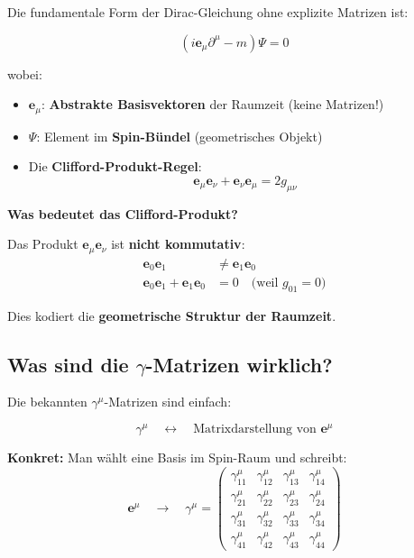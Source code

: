 Die fundamentale Form der Dirac-Gleichung ohne explizite Matrizen ist:

\begin{equation}
	\boxed{(i \mathbf{e}_\mu \partial^\mu - m)\Psi = 0}
	\label{eq:clifford_fundamental}
\end{equation}

wobei:
\begin{itemize}
	\item $\mathbf{e}_\mu$: \textbf{Abstrakte Basisvektoren} der Raumzeit (keine Matrizen!)
	\item $\Psi$: Element im \textbf{Spin-Bündel} (geometrisches Objekt)
	\item Die \textbf{Clifford-Produkt-Regel}:
	\begin{equation}
		\mathbf{e}_\mu \mathbf{e}_\nu + \mathbf{e}_\nu \mathbf{e}_\mu = 2 g_{\mu\nu}
		\label{eq:clifford_product_rule}
	\end{equation}
\end{itemize}

\textbf{Was bedeutet das Clifford-Produkt?}

Das Produkt $\mathbf{e}_\mu \mathbf{e}_\nu$ ist \textbf{nicht kommutativ}:
\begin{align}
	\mathbf{e}_0 \mathbf{e}_1 &\neq \mathbf{e}_1 \mathbf{e}_0 \\
	\mathbf{e}_0 \mathbf{e}_1 + \mathbf{e}_1 \mathbf{e}_0 &= 0 \quad \text{(weil } g_{01} = 0\text{)}
\end{align}

Dies kodiert die \textbf{geometrische Struktur der Raumzeit}.

\subsection{Was sind die $\gamma$-Matrizen wirklich?}
\label{subsec:what_are_gammas}

Die bekannten $\gamma^\mu$-Matrizen sind einfach:

\begin{equation}
	\gamma^\mu \quad \longleftrightarrow \quad \text{Matrixdarstellung von } \mathbf{e}^\mu
\end{equation}

\textbf{Konkret:} Man wählt eine Basis im Spin-Raum und schreibt:
\begin{equation}
	\mathbf{e}^\mu \quad \rightarrow \quad \gamma^\mu = 
	\begin{pmatrix}
		\gamma^\mu_{11} & \gamma^\mu_{12} & \gamma^\mu_{13} & \gamma^\mu_{14} \\
		\gamma^\mu_{21} & \gamma^\mu_{22} & \gamma^\mu_{23} & \gamma^\mu_{24} \\
		\gamma^\mu_{31} & \gamma^\mu_{32} & \gamma^\mu_{33} & \gamma^\mu_{34} \\
		\gamma^\mu_{41} & \gamma^\mu_{42} & \gamma^\mu_{43} & \gamma^\mu_{44}
	\end{pmatrix}
\end{equation}


